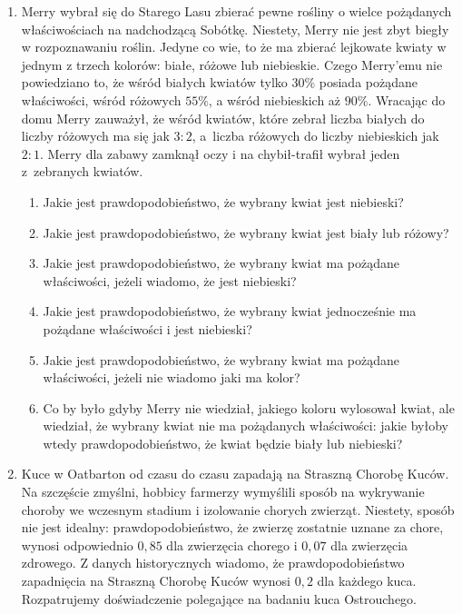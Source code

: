 \documentclass[twoside]{mwart}
\begin{document}
\begin{enumerate}
\item Merry wybrał się do Starego Lasu zbierać pewne rośliny o wielce pożądanych właściwościach na nadchodzącą Sobótkę.
Niestety, Merry nie jest zbyt biegły w rozpoznawaniu roślin.
Jedyne co wie, to że ma zbierać lejkowate kwiaty w jednym z trzech kolorów: białe, różowe lub niebieskie.
Czego Merry'emu nie powiedziano to, że wśród białych kwiatów tylko $30\%$ posiada pożądane właściwości, wśród różowych $55\%$, a wśród niebieskich
aż $90\%$.
Wracając do domu Merry zauważył, że wśród kwiatów, które zebrał liczba białych do liczby różowych ma się jak $3:2$, a~liczba różowych do
liczby niebieskich jak $2:1$. Merry dla zabawy zamknął oczy i na chybił-trafił wybrał jeden z~zebranych kwiatów.
 
\begin{enumerate}
	\item Jakie jest prawdopodobieństwo, że wybrany kwiat jest niebieski?
	\item Jakie jest prawdopodobieństwo, że wybrany kwiat jest biały lub różowy?
	\item Jakie jest prawdopodobieństwo, że wybrany kwiat ma pożądane właściwości, jeżeli wiadomo, że jest niebieski?
	\item Jakie jest prawdopodobieństwo, że wybrany kwiat jednocześnie ma pożądane właściwości i jest niebieski?
	\item Jakie jest prawdopodobieństwo, że wybrany kwiat ma pożądane właściwości, jeżeli nie wiadomo jaki ma kolor?
	\item Co by było gdyby Merry nie wiedział, jakiego koloru wylosował kwiat, ale wiedział, że wybrany kwiat nie ma pożądanych
		właściwości: jakie byłoby wtedy prawdopodobieństwo, że kwiat będzie biały lub niebieski?
\end{enumerate}
\clearpage
\item Kuce w Oatbarton od czasu do czasu zapadają na Straszną Chorobę Kuców.
Na szczęście zmyślni, hobbicy farmerzy wymyślili sposób na wykrywanie choroby we wczesnym stadium i izolowanie chorych zwierząt.
Niestety, sposób nie jest idealny: prawdopodobieństwo, że zwierzę zostatnie uznane za chore, wynosi odpowiednio $0,85$ dla zwierzęcia chorego i $0,07$ dla zwierzęcia zdrowego.
Z danych historycznych wiadomo, że prawdopodobieństwo zapadnięcia na Straszną Chorobę Kuców wynosi $0,2$ dla każdego kuca.
Rozpatrujemy doświadczenie polegające na badaniu kuca Ostrouchego.


\end{enumerate}
\end{document}
